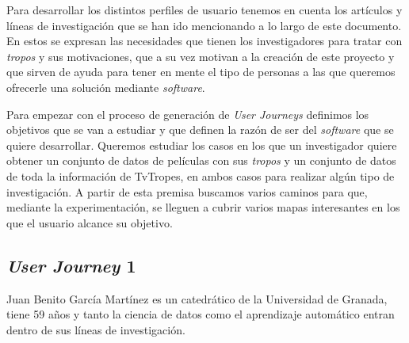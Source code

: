 Para desarrollar los distintos perfiles de usuario tenemos en cuenta los
artículos y líneas de investigación que se han ido mencionando a lo largo de
este documento. En estos se expresan las necesidades que tienen los
investigadores para tratar con \textit{tropos} y sus motivaciones, que a su vez
motivan a la creación de este proyecto y que sirven de ayuda para tener en mente
el tipo de personas a las que queremos ofrecerle una solución mediante
\textit{software}.

Para empezar con el proceso de generación de \textit{User Journeys} definimos
los objetivos que se van a estudiar y que definen la razón de ser del
\textit{software} que se quiere desarrollar. Queremos estudiar los casos en los
que un investigador quiere obtener un conjunto de datos de películas con sus
\textit{tropos} y un conjunto de datos de toda la información de TvTropes, en
ambos casos para realizar algún tipo de investigación. A partir de esta premisa
buscamos varios caminos para que, mediante la experimentación, se lleguen a
cubrir varios mapas interesantes en los que el usuario alcance su objetivo.

\subsection{\textit{User Journey} 1} 

Juan Benito García Martínez es un catedrático de la Universidad de Granada,
tiene 59 años y tanto la ciencia de datos como el aprendizaje automático entran
dentro de sus líneas de investigación.

